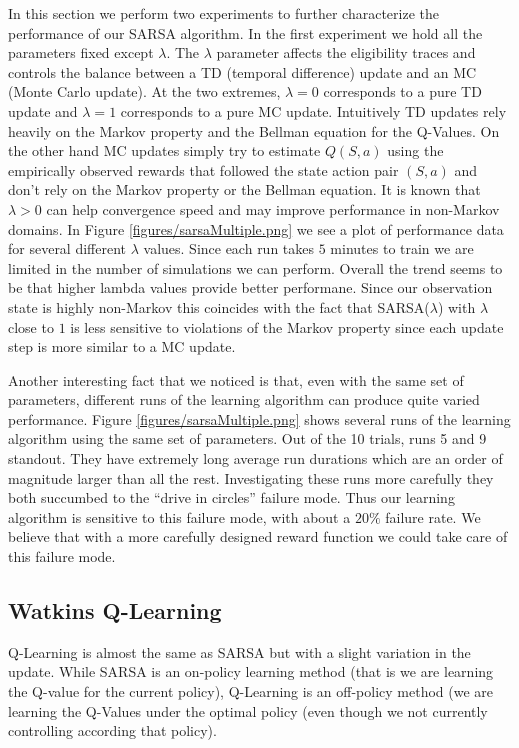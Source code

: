 \documentclass{article}
\begin{document}
In this section we perform two experiments to further characterize the performance of our SARSA algorithm. In the first experiment we hold all the parameters fixed except $\lambda$. The $\lambda$ parameter affects the eligibility traces and controls the balance between a TD (temporal difference) update and an MC (Monte Carlo update). At the two extremes, $\lambda = 0$ corresponds to a pure TD update and $\lambda = 1$ corresponds to a pure MC update. Intuitively TD updates rely heavily on the Markov property and the Bellman equation for the Q-Values. On the other hand MC updates simply try to estimate $Q(S,a)$ using the empirically observed rewards that followed the state action pair $(S,a)$ and don't rely on the Markov property or the Bellman equation. It is known  that $\lambda > 0$ can help convergence speed and may improve performance in non-Markov domains. In Figure \ref{figures/sarsaMultiple.png} we see a plot of performance data for several different $\lambda$ values. Since each run takes $5$ minutes to train we are limited in the number of simulations we can perform. Overall the trend seems to be that higher lambda values provide better performane. Since our observation state is highly non-Markov this coincides with the fact that SARSA($\lambda$) with $\lambda$ close to $1$ is less sensitive to violations of the Markov property since each update step is more similar to a MC update.


Another interesting fact that we noticed is that, even with the same set of parameters, different runs of the learning algorithm can produce quite varied performance. Figure \ref{figures/sarsaMultiple.png} shows several runs of the learning algorithm using the same set of parameters. Out of the 10 trials, runs 5 and 9 standout. They have extremely long average run durations which are an order of magnitude larger than all the rest. Investigating these runs more carefully they both succumbed to the ``drive in circles'' failure mode. Thus our learning algorithm is sensitive to this failure mode, with about a $20\%$ failure rate. We believe that with a more carefully designed reward function we could take care of this failure mode.


\subsection{Watkins Q-Learning}
\label{discrete_q_learning}

Q-Learning is almost the same as SARSA but with a slight variation in the update. While SARSA is an on-policy learning method (that is we are learning the Q-value for the current policy), Q-Learning is an off-policy method (we are learning the Q-Values under the optimal policy (even though we not currently controlling according that policy).
\end{document}
